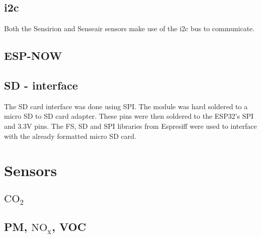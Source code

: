 \subsection{i2c}
Both the Sensirion and Senseair sensors make use of the i2c bus to communicate. 

\subsection{ESP-NOW}


\subsection{SD - interface}
The SD card interface was done using SPI. The module was hard soldered to a micro SD to SD card adapter. These pins were then soldered to the ESP32's SPI and 3.3V pins.
The FS, SD and SPI libraries from Espresiff were used to interface with the already formatted micro SD card.




\section{Sensors}
\subsection{$\mathrm{CO_2}$}




\subsection{PM, $\mathrm{NO_x}$, VOC}
